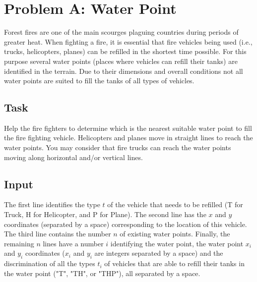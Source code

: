 \documentclass[11pt]{report}
\begin{document}
\clearpage

\section*{Problem A: Water Point}

Forest fires are one of the main scourges plaguing countries during periods of greater heat. When fighting a fire, it is essential that fire vehicles being used (i.e., trucks, helicopters, planes) can be refilled in the shortest time possible.
For this purpose several water points (places where vehicles can refill their
tanks) are identified in the terrain. Due to their dimensions and overall
conditions not all water points are suited to fill the tanks of all types of
vehicles.

\subsection*{Task}

Help the fire fighters to determine which is the nearest suitable water point to fill the fire fighting vehicle. Helicopters and planes move in straight lines to reach the water points. You may consider that fire trucks can reach the water points moving along horizontal and/or vertical lines.

\subsection*{Input}

The first line identifies the type $t$ of the vehicle that needs to be refilled
(T for Truck, H for Helicopter, and P for Plane). The second line has the $x$
and $y$ coordinates (separated by a space) corresponding to the location of this
vehicle. The third line contains the number $n$ of existing water
points. Finally, the remaining $n$ lines have a number $i$ identifying the water
point, the water point $x_i$ and $y_i$ coordinates ($x_i$ and $y_i$ are integers
separated by a space) and the discrimination of all the types $t_i$ of vehicles that are able to refill their tanks in the water point ("T", "TH", or "THP"), all separated by a space. %
\end{document}
